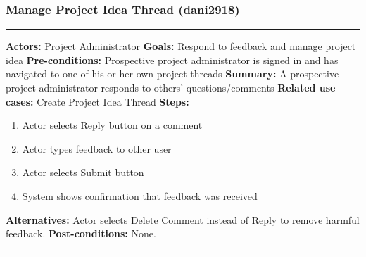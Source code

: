 \documentclass[11pt]{report}
\begin{document}
\subsubsection{Manage Project Idea Thread (dani2918)}
\vspace{2pt}
\hrule
\vspace{8pt}
 \textbf{Actors:} Project Administrator \newline
\textbf{Goals:} Respond to feedback and manage project idea  \newline
 \textbf{Pre-conditions:} Prospective project administrator is signed in and has navigated to one of his or her own project threads  \newline
 \textbf{Summary:}  A prospective project administrator responds to others' questions/comments \newline
\textbf{Related use cases:} Create Project Idea Thread \newline
\textbf{Steps:} \begin{enumerate}
  \item Actor selects Reply button on a comment
  \item Actor types feedback to other user
  \item Actor selects Submit button
  \item System shows confirmation that feedback was received

 \end{enumerate}
 \textbf{Alternatives:} Actor selects Delete Comment instead of Reply to remove harmful feedback. \newline
 \textbf{Post-conditions:} None. \newline
\vspace{8pt}
\hrule
\newpage
\end{document}
